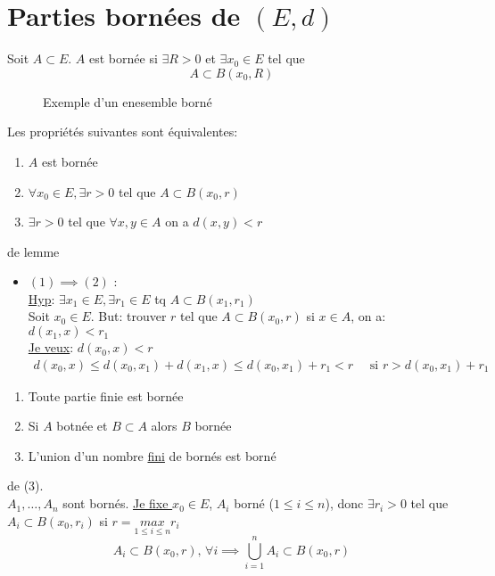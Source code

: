 \section{Parties bornées de $(E, d)$}
\begin{definition}
    Soit $A \subset E$. $A$ est bornée si  $\exists R > 0$ et $\exists x_0 \in E$ tel que 
    \[
    A \subset B(x_0, R)
    \] 
\end{definition}
\begin{figure}[H]
    \centering
    \caption{Exemple d'un enesemble borné}
    \label{fig:exemple-bornee}
\end{figure}
\begin{lemma}
   Les propriétés suivantes sont équivalentes:
   \begin{enumerate}
       \item $A$ est bornée
       \item  $\forall x_0 \in E, \exists r > 0$ tel que $A \subset B(x_0, r)$
       \item $\exists r > 0$ tel que $\forall x, y \in A$ on a $d(x, y) < r$
   \end{enumerate}
\end{lemma}
\begin{explanation} de lemme
   \begin{itemize}
       \item $(1) \implies (2)$ :\\
           \underline{Hyp}: $\exists x_1 \in E, \exists r_1 \in E$ tq $A \subset B(x_1, r_1)$\\
           Soit $x_0 \in E$. But: trouver $r$ tel que  $A \subset B(x_0, r)$ si $x \in A$, on a:  $d(x_1, x) < r_1$\\
           \underline{Je veux}: $d(x_0, x) <r$\\
          \begin{align*}
              d(x_0, x) \le d(x_0, x_1) + d(x_1, x) \le d(x_0, x_1) + r_1 < r \quad \text{ si } r > d(x_0, x_1) + r_1
          \end{align*} 
   \end{itemize} 
\end{explanation}
\begin{property}
   \begin{enumerate}
       \item Toute partie finie est bornée
       \item Si $A$ botnée et  $B \subset A$ alors $B$ bornée
       \item L'union d'un nombre \underline{fini} de bornés est borné
   \end{enumerate} 
\end{property}
\begin{preuve}{de (3).}\\
    $A_1, \ldots, A_n$ sont bornés. \underline{Je fixe $x_0 \in E$}, $A_i$ borné ($1 \le i \le n$), donc $\exists r_i > 0$ tel que $A_i \subset B(x_0, r_i)$ si $r = \underset{1 \le  i \le n}{max} r_i$ 
    \[
        A_i \subset B(x_0, r), \, \forall i \implies \bigcup\limits_{i=1}^{n} A_i \subset B(x_0, r)
    \] 
\end{preuve}
